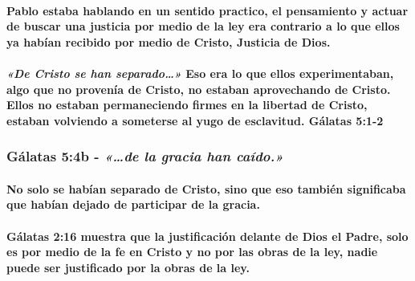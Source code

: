 \documentclass[11a pt,twoside]{article}
\newcommand{\scripture}[1]{%
  {\fontsize{12pt}{16pt}\selectfont\ScriptureFont\itshape #1}%
}
\let\oldsubsubsection\subsubsection
\renewcommand{\subsubsection}{\needspace{4\baselineskip}\oldsubsubsection}
\let\oldparagraph\paragraph
\renewcommand{\paragraph}{\needspace{3\baselineskip}\oldparagraph}
\begin{document}
\paragraph{Pablo estaba hablando en un sentido practico, el pensamiento
y actuar de buscar una justicia por medio de la ley era contrario a lo
que ellos ya habían recibido por medio de Cristo, Justicia de
Dios.}\label{pablo-estaba-hablando-en-un-sentido-practico-el-pensamiento-y-actuar-de-buscar-una-justicia-por-medio-de-la-ley-era-contrario-a-lo-que-ellos-ya-habuxedan-recibido-por-medio-de-cristo-justicia-de-dios.}

\paragraph{\texorpdfstring{\scripture{«De Cristo se han separado…»} Eso
era lo que ellos experimentaban, algo que no provenía de Cristo, no
estaban aprovechando de Cristo. Ellos no estaban permaneciendo firmes en
la libertad de Cristo, estaban volviendo a someterse al yugo de
esclavitud. Gálatas
5:1-2}{ Eso era lo que ellos experimentaban, algo que no provenía de Cristo, no estaban aprovechando de Cristo. Ellos no estaban permaneciendo firmes en la libertad de Cristo, estaban volviendo a someterse al yugo de esclavitud. Gálatas 5:1-2}}\label{de-cristo-se-han-separado-eso-era-lo-que-ellos-experimentaban-algo-que-no-provenuxeda-de-cristo-no-estaban-aprovechando-de-cristo.-ellos-no-estaban-permaneciendo-firmes-en-la-libertad-de-cristo-estaban-volviendo-a-someterse-al-yugo-de-esclavitud.-guxe1latas-51-2}

\subsubsection{\texorpdfstring{Gálatas 5:4b -
\scripture{«…de la gracia han caído.»}}{Gálatas 5:4b - }}\label{guxe1latas-54b---de-la-gracia-han-cauxeddo.}

\paragraph{No solo se habían separado de Cristo, sino que eso también
significaba que habían dejado de participar de la
gracia.}\label{no-solo-se-habuxedan-separado-de-cristo-sino-que-eso-tambiuxe9n-significaba-que-habuxedan-dejado-de-participar-de-la-gracia.}

\paragraph{Gálatas 2:16 muestra que la justificación delante de Dios el
Padre, solo es por medio de la fe en Cristo y no por las obras de la
ley, nadie puede ser justificado por la obras de la
ley.}\label{guxe1latas-216-muestra-que-la-justificaciuxf3n-delante-de-dios-el-padre-solo-es-por-medio-de-la-fe-en-cristo-y-no-por-las-obras-de-la-ley-nadie-puede-ser-justificado-por-la-obras-de-la-ley.}
\end{document}
